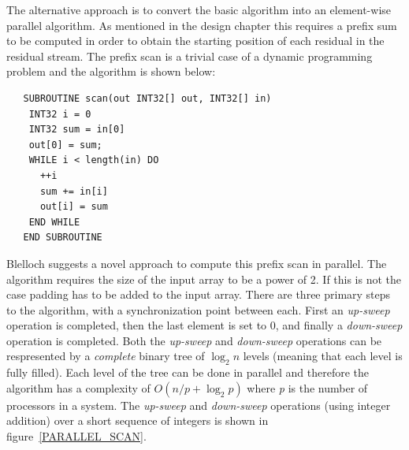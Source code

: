   The alternative approach is to convert the basic algorithm into an element-wise parallel algorithm. As mentioned in the design chapter this requires a prefix sum to be computed 
  in order to obtain the starting position of each residual in the residual stream. The prefix scan is a trivial case of a dynamic programming problem and the algorithm 
  \cite{blelloch1990prefix} is shown below:
  \begin{verbatim}
   SUBROUTINE scan(out INT32[] out, INT32[] in)
    INT32 i = 0
    INT32 sum = in[0]
    out[0] = sum;
    WHILE i < length(in) DO
      ++i
      sum += in[i]
      out[i] = sum
    END WHILE
   END SUBROUTINE
  \end{verbatim}
  Blelloch suggests a novel approach \cite{blelloch1990prefix} to compute this prefix scan in parallel. The algorithm requires the size of the input array to
  be a power of 2. If this is not the case padding has to be added to the input array. There are three primary steps to the algorithm, with a synchronization point between each. First
  an \textit{up-sweep} operation is completed, then the last element is set to 0, and finally a \textit{down-sweep} operation is completed. Both the \textit{up-sweep} and \textit{down-sweep} operations
  can be respresented by a \textit{complete} binary tree of $\log_2n$ levels (meaning that each level is fully filled). Each level of the tree can be done in parallel and therefore the algorithm has a 
  complexity of $O(n/p + \log_2{p})$ where \textit{p} is the number of processors in a system. The \textit{up-sweep} and \textit{down-sweep} operations (using integer addition) over a short sequence of integers is shown
  in figure~\ref{PARALLEL_SCAN}.
